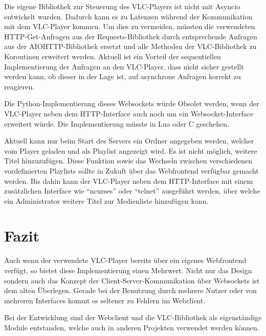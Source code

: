 \documentclass[12pt,a4paper,hidelinks]{scrreprt}
\begin{document}
	Die eigene Bibliothek zur Steuerung des VLC-Players ist nicht mit Asyncio entwickelt wurden. Dadurch kann es zu Latenzen während der Kommunikation mit dem VLC-Player kommen. Um dies zu vermeiden, müssten die verwendeten HTTP-Get-Anfragen aus der Requests-Bibliothek durch entsprechende Anfragen aus der AIOHTTP-Bibliothek ersetzt und alle Methoden der VLC-Bibliothek zu Koroutinen erweitert werden. Aktuell ist ein Vorteil der sequentiellen Implementierung der Anfragen an den VLC-Player, dass nicht sicher gestellt werden kann, ob dieser in der Lage ist, auf asynchrone Anfragen korrekt zu reagieren.
	
	Die Python-Implementierung dieses Websockets würde Obsolet werden, wenn der VLC-Player neben dem HTTP-Interface auch noch um ein Websocket-Interface erweitert würde. Die Implementierung müsste in Lua oder C geschehen.
	
	Aktuell kann nur beim Start des Servers ein Ordner angegeben werden, welcher vom Player geladen und als Playlist angezeigt wird. Es ist nicht möglich, weitere Titel hinzuzufügen. Diese Funktion sowie das Wechseln zwischen verschiedenen vordefinierten Playlists sollte in Zukuft über das Webfrontend verfügbar gemacht werden. Bis dahin kann der VLC-Player neben dem HTTP-Interface mit einem zusätzlichen Interface wie \enquote{ncurses} oder \enquote{telnet} ausgeführt werden, über welche ein Administrator weitere Titel zur Medienliste hinzufügen kann.

\section{Fazit}
	Auch wenn der verwendete VLC-Player bereits über ein eigenes Webfrontend verfügt, so bietet diese Implementierung einen Mehrwert. Nicht nur das Design sondern auch das Konzept der Client-Server-Kommunikation über Websockets ist dem alten Überlegen. Gerade bei der Benutzung durch mehrere Nutzer oder von mehreren Interfaces kommt es seltener zu Fehlern im Webclient.
	
	Bei der Entwicklung sind der Webclient und die VLC-Bibliothek als eigenständige Module entstanden, welche auch in anderen Projekten verwendet werden können.


\printglossaries
\end{document}
